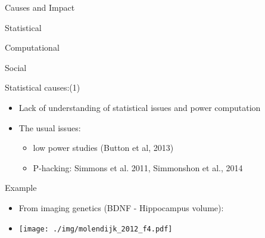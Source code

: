 \documentclass[ignorenonframetext,]{beamer}
\begin{document}
\begin{frame}{Causes and Impact}

\begin{block}{Statistical}

\end{block}

\begin{block}{Computational}

\end{block}

\begin{block}{Social}

\end{block}

\end{frame}

\begin{frame}

\begin{block}{Statistical causes:(1)}

\begin{itemize}[<+->]
\itemsep1pt\parskip0pt
\item
  Lack of understanding of statistical issues and power computation
\item
  The usual issues:

  \begin{itemize}[<+->]
  \itemsep1pt\parskip0pt
  \item
    low power studies (Button et al, 2013)
  \item
    P-hacking: Simmons et al. 2011, Simmonshon et al., 2014
  \end{itemize}
\end{itemize}

\end{block}

\begin{block}{Example}

\begin{itemize}[<+->]
\itemsep1pt\parskip0pt
\item
  From imaging genetics (BDNF - Hippocampus volume):
\item
  \texttt{[image: ./img/molendijk\_2012\_f4.pdf]}
\end{itemize}

\end{block}

\end{frame}
\end{document}
